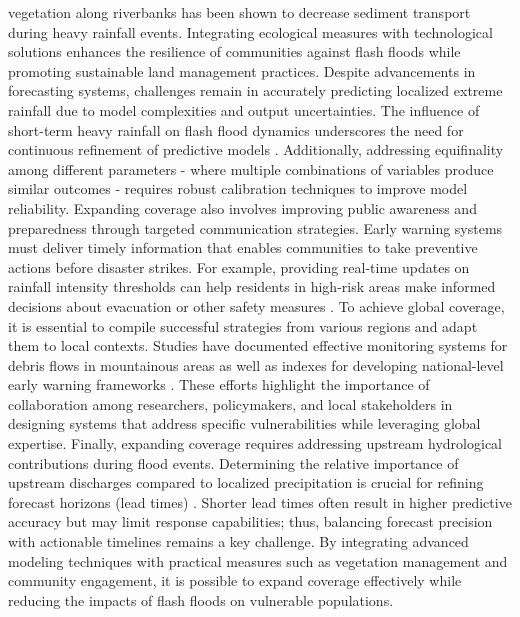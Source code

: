 vegetation along riverbanks has been shown to decrease sediment transport during heavy rainfall events. Integrating ecological measures with technological solutions enhances the resilience of communities against flash floods while promoting sustainable land management practices. Despite advancements in forecasting systems, challenges remain in accurately predicting localized extreme rainfall due to model complexities and output uncertainties. The influence of short-term heavy rainfall on flash flood dynamics underscores the need for continuous refinement of predictive models \citep{Zhang2022}. Additionally, addressing equifinality among different parameters - where multiple combinations of variables produce similar outcomes - requires robust calibration techniques to improve model reliability. Expanding coverage also involves improving public awareness and preparedness through targeted communication strategies. Early warning systems must deliver timely information that enables communities to take preventive actions before disaster strikes. For example, providing real-time updates on rainfall intensity thresholds can help residents in high-risk areas make informed decisions about evacuation or other safety measures \citep{Lu2021}. To achieve global coverage, it is essential to compile successful strategies from various regions and adapt them to local contexts. Studies have documented effective monitoring systems for debris flows in mountainous areas as well as indexes for developing national-level early warning frameworks \citep{Maqtan2022a}\citep{Maqtan2022b}. These efforts highlight the importance of collaboration among researchers, policymakers, and local stakeholders in designing systems that address specific vulnerabilities while leveraging global expertise. Finally, expanding coverage requires addressing upstream hydrological contributions during flood events. Determining the relative importance of upstream discharges compared to localized precipitation is crucial for refining forecast horizons (lead times) \citep{Munoz2018}. Shorter lead times often result in higher predictive accuracy but may limit response capabilities; thus, balancing forecast precision with actionable timelines remains a key challenge. By integrating advanced modeling techniques with practical measures such as vegetation management and community engagement, it is possible to expand coverage effectively while reducing the impacts of flash floods on vulnerable populations.

